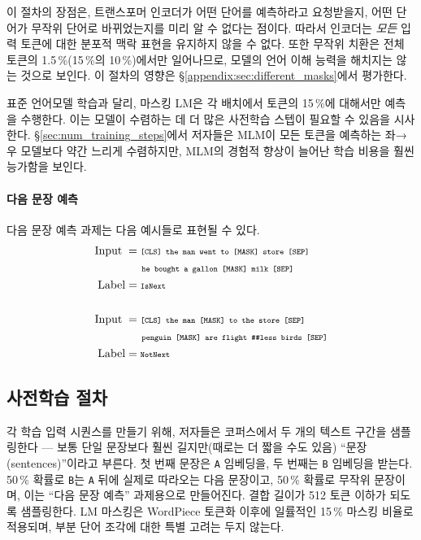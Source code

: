 이 절차의 장점은, 트랜스포머 인코더가 어떤 단어를 예측하라고 요청받을지, 어떤 단어가 무작위 단어로 바뀌었는지를 미리 알 수 없다는 점이다. 따라서 인코더는 \emph{모든} 입력 토큰에 대한 분포적 맥락 표현을 유지하지 않을 수 없다. 또한 무작위 치환은 전체 토큰의 1.5\,\%(15\,\%의 10\,\%)에서만 일어나므로, 모델의 언어 이해 능력을 해치지는 않는 것으로 보인다. 이 절차의 영향은 \S\ref{appendix:sec:different_masks}에서 평가한다.

표준 언어모델 학습과 달리, 마스킹 LM은 각 배치에서 토큰의 15\,\%에 대해서만 예측을 수행한다. 이는 모델이 수렴하는 데 더 많은 사전학습 스텝이 필요할 수 있음을 시사한다. \S\ref{sec:num_training_steps}에서 저자들은 MLM이 모든 토큰을 예측하는 좌→우 모델보다 약간 느리게 수렴하지만, MLM의 경험적 향상이 늘어난 학습 비용을 훨씬 능가함을 보인다.

\paragraph{다음 문장 예측}

다음 문장 예측 과제는 다음 예시들로 표현될 수 있다.
\begin{align*}
\text{Input\;} &= \text{\tt {\scriptsize [CLS] the man went to [MASK] store [SEP]}} \\
& \text{\tt {\scriptsize \;\;\;\;\;\;\;he bought a gallon [MASK] milk [SEP]}}\\
\text{Label} &= \text{\tt {\scriptsize IsNext}} \\
\\
\text{Input\;} &= \text{\tt {\scriptsize [CLS] the man [MASK] to the store [SEP]}}\\
&\text{\tt {\scriptsize \;\;\;\;\;\;\;penguin [MASK] are flight \#\#less birds [SEP]}}\\
\text{Label} &= \text{\tt {\scriptsize NotNext}}
\end{align*}

\subsection{사전학습 절차}
\label{sec:pretraining_procedure}

각 학습 입력 시퀀스를 만들기 위해, 저자들은 코퍼스에서 두 개의 텍스트 구간을 샘플링한다 — 보통 단일 문장보다 훨씬 길지만(때로는 더 짧을 수도 있음) ``문장(sentences)''이라고 부른다. 첫 번째 문장은 {\tt A} 임베딩을, 두 번째는 {\tt B} 임베딩을 받는다. 50\,\% 확률로 {\tt B}는 {\tt A} 뒤에 실제로 따라오는 다음 문장이고, 50\,\% 확률로 무작위 문장이며, 이는 ``다음 문장 예측'' 과제용으로 만들어진다. 결합 길이가 512 토큰 이하가 되도록 샘플링한다. LM 마스킹은 WordPiece 토큰화 이후에 일률적인 15\,\% 마스킹 비율로 적용되며, 부분 단어 조각에 대한 특별 고려는 두지 않는다.

